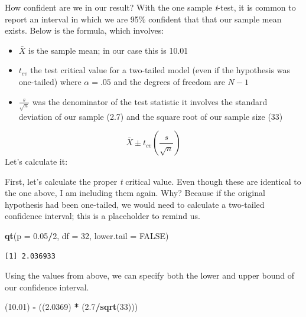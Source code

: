 \documentclass[
  11pt,
]{book}
\newenvironment{Shaded}{\begin{snugshade}}{\end{snugshade}}
\newcommand{\AttributeTok}[1]{\textcolor[rgb]{0.27,0.27,0.27}{#1}}
\newcommand{\ConstantTok}[1]{\textcolor[rgb]{0.37,0.37,0.37}{#1}}
\newcommand{\DecValTok}[1]{\textcolor[rgb]{0.06,0.06,0.06}{#1}}
\newcommand{\FloatTok}[1]{\textcolor[rgb]{0.06,0.06,0.06}{#1}}
\newcommand{\FunctionTok}[1]{\textcolor[rgb]{0.27,0.27,0.27}{\textbf{#1}}}
\newcommand{\NormalTok}[1]{#1}
\newcommand{\SpecialCharTok}[1]{\textcolor[rgb]{0.43,0.43,0.43}{\textbf{#1}}}
\providecommand{\tightlist}{%
  \setlength{\itemsep}{0pt}\setlength{\parskip}{0pt}}
\begin{document}
How confident are we in our result? With the one sample \emph{t}-test, it is common to report an interval in which we are 95\% confident that that our sample mean exists. Below is the formula, which involves:

\begin{itemize}
\tightlist
\item
  \(\bar{X}\) is the sample mean; in our case this is 10.01
\item
  \(t_{cv}\) the test critical value for a two-tailed model (even if the hypothesis was one-tailed) where \(\alpha = .05\) and the degrees of freedom are \(N-1\)
\item
  \(\frac{s}{\sqrt{n}}\) was the denominator of the test statistic it involves the standard deviation of our sample (2.7) and the square root of our sample size (33)
\end{itemize}

\[\bar{X} \pm t_{cv}(\frac{s}{\sqrt{n}})\] Let's calculate it:

First, let's calculate the proper \emph{t} critical value. Even though these are identical to the one above, I am including them again. Why? Because if the original hypothesis had been one-tailed, we would need to calculate a two-tailed confidence interval; this is a placeholder to remind us.

\begin{Shaded}
\begin{Highlighting}[]
\FunctionTok{qt}\NormalTok{(}\AttributeTok{p =} \FloatTok{0.05}\SpecialCharTok{/}\DecValTok{2}\NormalTok{, }\AttributeTok{df =} \DecValTok{32}\NormalTok{, }\AttributeTok{lower.tail =} \ConstantTok{FALSE}\NormalTok{)}
\end{Highlighting}
\end{Shaded}

\begin{verbatim}
[1] 2.036933
\end{verbatim}

Using the values from above, we can specify both the lower and upper bound of our confidence interval.

\begin{Shaded}
\begin{Highlighting}[]
\NormalTok{(}\FloatTok{10.01}\NormalTok{) }\SpecialCharTok{{-}}\NormalTok{ ((}\FloatTok{2.0369}\NormalTok{) }\SpecialCharTok{*}\NormalTok{ (}\FloatTok{2.7}\SpecialCharTok{/}\FunctionTok{sqrt}\NormalTok{(}\DecValTok{33}\NormalTok{)))}
\end{Highlighting}
\end{Shaded}
\end{document}
